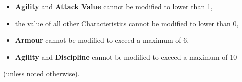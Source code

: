 \begin{itemize}[label={-}]
\item \textbf{Agility} and \textbf{Attack Value} cannot be modified to lower than 1,
\item the value of all other Characteristics cannot be modified to lower than 0,
\item \textbf{Armour} cannot be modified to exceed a maximum of 6,
\item \textbf{Agility} and \textbf{Discipline} cannot be modified to exceed a maximum of 10
\end{itemize}

(unless noted otherwise).



